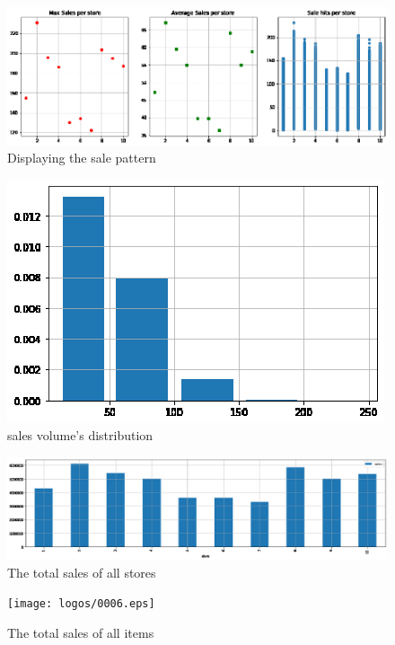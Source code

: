 \begin{figure}[htbp]
	\centering
	
	\includegraphics[scale=0.8]{logos/0003.eps}
	\caption{Displaying the sale pattern}\label{fig:001.eps}
\end{figure}

\begin{figure}[htbp]
	\centering
	
	\includegraphics[scale=0.8]{logos/0004.eps}
	\caption{ sales volume’s distribution}\label{fig:002.eps}
\end{figure}

\begin{figure}[htbp]
	\centering
	
	\includegraphics[scale=0.6]{logos/0005.eps}
	\caption{ The total sales of all stores}\label{fig:003.eps}
\end{figure}

\begin{figure}[htbp]
	\centering
	
	\texttt{[image: logos/0006.eps]}
	\caption{ The total sales of all items}\label{fig:004.eps}
\end{figure}

